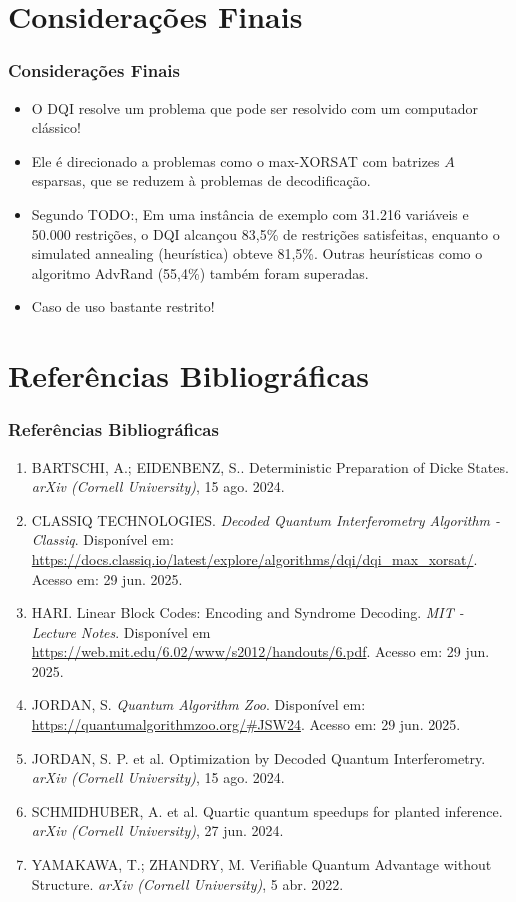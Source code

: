 \documentclass[aspectratio=169]{beamer}
\begin{document}
\section{Considerações Finais}
\begin{frame}
  \frametitle{Considerações Finais}
  
  \begin{itemize}
    \item O DQI resolve um problema que pode ser resolvido com um computador clássico!
    \item Ele é direcionado a problemas como o max-XORSAT com batrizes $A$ esparsas, que se reduzem à problemas de decodificação.
    \item Segundo TODO:, Em uma instância de exemplo com 31.216 variáveis e 50.000 restrições, o DQI alcançou 83,5\% de restrições satisfeitas, enquanto o simulated annealing (heurística) obteve 81,5\%. Outras heurísticas como o algoritmo AdvRand (55,4\%) também foram superadas.
    \item Caso de uso bastante restrito!
  \end{itemize}
  
\end{frame}

\section{Referências Bibliográficas}

\begin{frame}[fragile]
  \frametitle{Referências Bibliográficas}
  
  \begin{enumerate}
    \footnotesize
    \item BARTSCHI, A.; EIDENBENZ, S.. Deterministic Preparation of Dicke States. \textit{arXiv (Cornell University)}, 15 ago. 2024.
    \item CLASSIQ TECHNOLOGIES. \textit{Decoded Quantum Interferometry Algorithm - Classiq}. Disponível em: \url{https://docs.classiq.io/latest/explore/algorithms/dqi/dqi_max_xorsat/}. Acesso em: 29 jun. 2025.
    \item HARI. Linear Block Codes: Encoding and Syndrome Decoding. \textit{MIT - Lecture Notes}. Disponível em \url{https://web.mit.edu/6.02/www/s2012/handouts/6.pdf}. Acesso em: 29 jun. 2025.
    \item JORDAN, S. \textit{Quantum Algorithm Zoo}. Disponível em: \url{https://quantumalgorithmzoo.org/#JSW24}. Acesso em: 29 jun. 2025.
    \item JORDAN, S. P. et al. Optimization by Decoded Quantum Interferometry. \textit{arXiv (Cornell University)}, 15 ago. 2024.
    \item SCHMIDHUBER, A. et al. Quartic quantum speedups for planted inference. \textit{arXiv (Cornell University)}, 27 jun. 2024.
    \item YAMAKAWA, T.; ZHANDRY, M. Verifiable Quantum Advantage without Structure. \textit{arXiv (Cornell University)}, 5 abr. 2022.
  \end{enumerate}
  
\end{frame}
\end{document}
